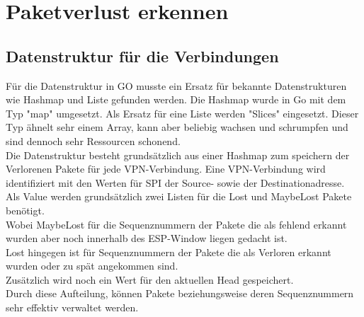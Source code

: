 \section{Paketverlust erkennen}
\label{sec:Paketverlust erkennen}

\subsection{Datenstruktur für die \esp Verbindungen}
Für die Datenstruktur in GO musste ein Ersatz für bekannte Datenstrukturen wie Hashmap und Liste gefunden werden. Die Hashmap wurde in Go mit dem Typ "map" umgesetzt. Als Ersatz für eine Liste werden "Slices" eingesetzt. Dieser Typ ähnelt sehr einem Array, kann aber beliebig wachsen und schrumpfen und sind dennoch sehr Ressourcen schonend.\\

Die Datenstruktur besteht grundsätzlich aus einer Hashmap zum speichern der Verlorenen Pakete für jede VPN-Verbindung.
Eine VPN-Verbindung wird identifiziert mit den Werten für \acs{SPI} der Source- sowie der Destinationadresse.\\
Als Value werden grundsätzlich zwei Listen für die Lost und MaybeLost Pakete benötigt.\\ 
Wobei MaybeLost für die Sequenznummern der Pakete die als fehlend erkannt wurden aber noch innerhalb des ESP-Window liegen gedacht ist.\\
Lost hingegen ist für Sequenznummern der Pakete die als Verloren erkannt wurden oder zu spät angekommen sind.\\
Zusätzlich wird noch ein Wert für den aktuellen Head gespeichert.\\
Durch diese Aufteilung, können Pakete beziehungsweise deren Sequenznummern sehr effektiv verwaltet werden.

